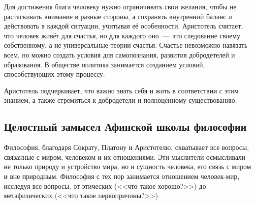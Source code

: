 Для достижения блага человеку нужно ограничивать свои желания, чтобы не растаскивать внимание в разные стороны, а сохранять внутренний баланс и действовать в каждой ситуации, учитывая её особенности. Аристотель считает, что человек живёт для счастья, но для каждого оно~---~это следование своему собственному, а не универсальные теории счастья. Счастье невозможно навязать всем, но можно создать условия для самопознания, развития добродетелей и образования. В обществе политика занимается созданием условий, способствующих этому процессу.

Аристотель подчеркивает, что важно знать себя и жить в соответствии с этим знанием, а также стремиться к добродетели и полноценному существованию.

\subsection{Целостный замысел Афинской школы философии}



Философия, благодаря Сократу, Платону и Аристотелю, охватывает все вопросы, связанные с миром, человеком и их отношениями. Эти мыслители осмысливали не только природу и устройство мира, но и сущность человека, его связь с миром и вне природным. Философия с тех пор занимается отношением человек-мир, исследуя все вопросы, от этических (<<что такое хорошо?>>) до метафизических (<<что такое первопричины?>>)

